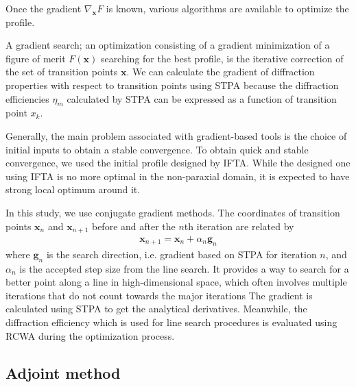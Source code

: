 Once the gradient $\nabla_\mathbf{x}F$ is known, various algorithms are available to optimize the profile.

A gradient search; an optimization consisting of a gradient minimization of a figure of merit $F(\mathbf{x})$ searching for the best profile, is the iterative correction of the set of transition points $\mathbf{x}$.
We can calculate the gradient of diffraction properties with respect to transition points using STPA because the diffraction efficiencies $\eta_{m}$ calculated by STPA can be expressed as a function of transition point $x_k$.
 
Generally, the main problem associated with gradient-based tools is the choice of initial inputs to obtain a stable convergence.
To obtain quick and stable convergence, we used the initial profile designed by IFTA. 
While the designed one using IFTA is no more optimal in the non-paraxial domain, it is expected to have strong local optimum around it.

In this study, we use conjugate gradient methods.
The coordinates of transition points $\mathbf{x}_{n}$ and $\mathbf{x}_{n+1}$ before and after the $n$th iteration are related by 
\begin{align}\label{eq:iter_cg}
\mathbf{x}_{n+1} = \mathbf{x}_{n} + \alpha _{n} \mathbf{g}_{n}
\end{align}
where $\mathbf{g}_{n}$ is the search direction, i.e. gradient based on STPA for iteration $n$, and $\alpha _{n}$ is the accepted step size from the line search.
It provides a way to search for a better point along a line in high-dimensional space, which often involves multiple iterations that do not count towards the major iterations%
The gradient is calculated using STPA to get the analytical derivatives. Meanwhile, the diffraction efficiency which is used for line search procedures is evaluated using RCWA during the optimization process.

\subsection{Adjoint method}

